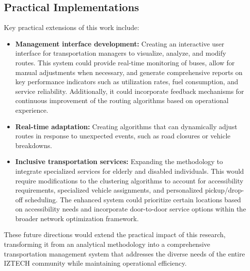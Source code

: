 \subsection{Practical Implementations}

Key practical extensions of this work include:

\begin{itemize}
    \item \textbf{Management interface development:} Creating an interactive user interface for transportation managers to visualize, analyze, and modify routes. This system could provide real-time monitoring of buses, allow for manual adjustments when necessary, and generate comprehensive reports on key performance indicators such as utilization rates, fuel consumption, and service reliability. Additionally, it could incorporate feedback mechanisms for continuous improvement of the routing algorithms based on operational experience.
    
    \item \textbf{Real-time adaptation:} Creating algorithms that can dynamically adjust routes in response to unexpected events, such as road closures or vehicle breakdowns.
    
    \item \textbf{Inclusive transportation services:} Expanding the methodology to integrate specialized services for elderly and disabled individuals. This would require modifications to the clustering algorithms to account for accessibility requirements, specialized vehicle assignments, and personalized pickup/drop-off scheduling. The enhanced system could prioritize certain locations based on accessibility needs and incorporate door-to-door service options within the broader network optimization framework.
\end{itemize}

These future directions would extend the practical impact of this research, transforming it from an analytical methodology into a comprehensive transportation management system that addresses the diverse needs of the entire IZTECH community while maintaining operational efficiency.

